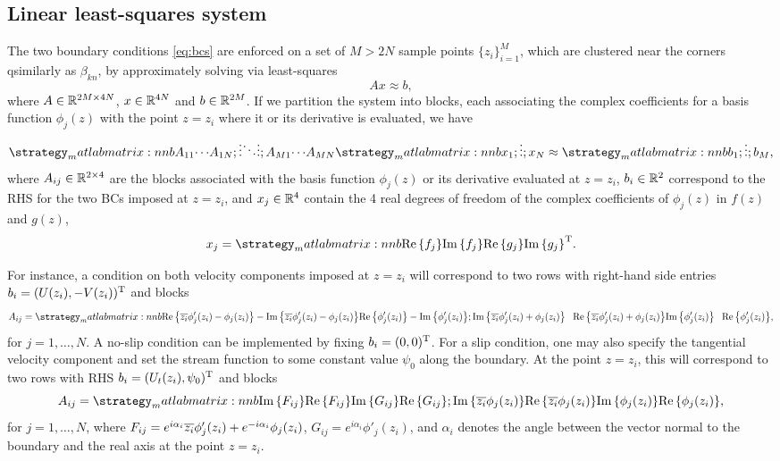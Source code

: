 \documentclass{article}
\begin{document}
\subsection{Linear least-squares system}

The two boundary conditions \eqref{eq:bcs} are enforced on a set of $M > 2N$
sample points $\{z_i \}_{i=1}^M$, which are clustered near the corners
qsimilarly as $\beta_{kn}$, by approximately solving via least-squares
\begin{equation} \label{eq:LS}
A x\approx b,
\end{equation}
where $A\in\mathbb{R}^{2M\times 4N}$, $x\in\mathbb{R}^{4N}$ and $b\in\mathbb{R}^{2M}$. If
we partition the system into blocks, each associating the complex coefficients
for a basis function $\phi_j(z)$ with the point $z=z_i$ where it or its
derivative is evaluated, we have
\begin{equation}
\matlabmatrix{A_{11} {\cdots} A_{1N}; {\vdots} {\ddots} {\vdots}; A_{M1} {\cdots} A_{MN}}
\matlabmatrix{x_{1}; {\vdots}; x_{N}} \approx \matlabmatrix{b_{1}; {\vdots}; b_{M}},
\end{equation}
where $A_{ij}\in\mathbb{R}^{2\times 4}$ are the blocks associated with the basis
function $\phi_{j}(z)$ or its derivative evaluated at $z=z_i$, $b_i\in\mathbb{R}^2$
correspond to the RHS for the two BCs imposed at $z=z_i$, and $x_j\in\mathbb{R}^4$
contain the 4 real degrees of freedom of the complex coefficients of
$\phi_j(z)$ in $f(z)$ and $g(z)$,
\begin{equation}
x_ j = \matlabmatrix{\real{f_j} \imag{f_j} \real{g_j} \imag{g_j}}^\transp.
\end{equation}


For instance, a condition on both velocity components imposed at $z=z_i$ will
correspond to two rows with right-hand side entries $b_i=(U(z_i),
-V(z_i))^{\text{T}}$ and blocks
\begin{equation}
\renewcommand*{\arraystretch}{1.5}
A_{ij}= \matlabmatrix{\real{\conj{z_i}\phi'_j(z_i)-\phi_j(z_i)} -\imag{\conj{z_i}\phi'_j(z_i)-\phi_j(z_i)} \real{\phi'_j(z_i)} -\imag{\phi'_j(z_i)}; 
\imag{\conj{z_i}\phi'_j(z_i)+\phi_j(z_i)} \phantom{+}\real{\conj{z_i}\phi'_j(z_i)+\phi_j(z_i)} \imag{\phi'_j(z_i)} \phantom{+}\real{\phi'_j(z_i)}},
\end{equation}
for $j=1,\ldots,N$. A no-slip condition can be implemented by fixing
$b_i=(0,0)^{\text{T}}$.  For a slip condition, one may also specify the tangential
velocity component and set the stream function to some constant value $\psi_0$
along the boundary. At the point $z=z_i$, this will correspond to two rows with
RHS $b_i=(U_t(z_i),\psi_0)^{\text{T}}$ and blocks
\begin{equation}
\renewcommand*{\arraystretch}{1.5}
A_{ij}=\matlabmatrix{\imag{F_{ij}} \real{F_{ij}} \imag{G_{ij}} \real{G_{ij}}; 
\imag{\conj{z_i}\phi_j(z_i)} \real{\conj{z_i}\phi_j(z_i)} \imag{\phi_j(z_i)} \real{\phi_j(z_i)}},
\end{equation}
for $j=1,\ldots,N$, where
$F_{ij}=e^{i\alpha_i}{\overline{z_i}}\phi'_j(z_i)+e^{-i\alpha_i}\phi_j(z_i)$,
$G_{ij}=e^{i\alpha_i}\phi'_j(z_i)$, and $\alpha_i$ denotes the angle between
the vector normal to the boundary and the real axis at the point $z=z_i$.
\end{document}
